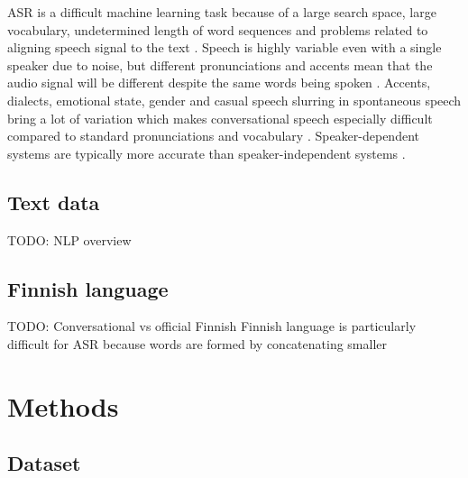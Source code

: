 \documentclass[utf8,english]{gradu3}
\begin{document}
ASR is a difficult machine learning task because of a large search space, large vocabulary, undetermined length of word sequences and problems related to aligning speech signal to the text \parencite{enarviAutomaticSpeechRecognition2017}. Speech is highly variable even with a single speaker due to noise, but different pronunciations and accents mean that the audio signal will be different despite the same words being spoken \parencite{juangAutomaticSpeechRecognition2005}. Accents, dialects, emotional state, gender and casual speech slurring in spontaneous speech bring a lot of variation which makes conversational speech especially difficult compared to standard pronunciations and vocabulary \parencite{benzeghibaAutomaticSpeechRecognition2007, juangAutomaticSpeechRecognition2005}. Speaker-dependent systems are typically more accurate than speaker-independent systems \parencite{benzeghibaAutomaticSpeechRecognition2007,enarviAutomaticSpeechRecognition2017}.





\section{Text data}
TODO: NLP overview \parencite{silfverbergFinnPosOpensourceMorphological2016, kanervaTurkuNeuralParser2018}


\section{Finnish language}
TODO: Conversational vs official Finnish
Finnish language is particularly difficult for ASR because words are formed by concatenating smaller \parencite{enarviAutomaticSpeechRecognition2017}




\chapter{Methods}


\section{Dataset}
\end{document}
